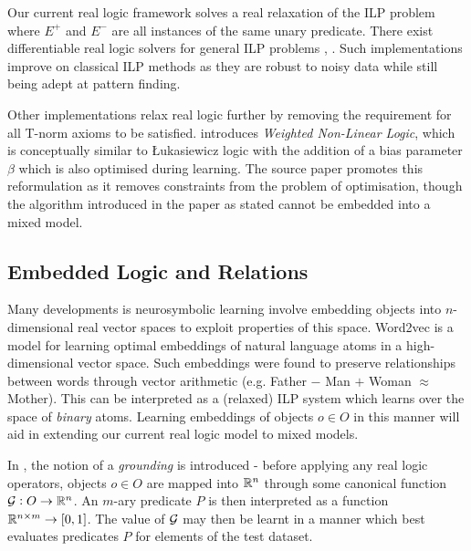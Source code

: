 Our current real logic framework solves a real relaxation of the ILP problem where $E^+$ and $E^-$ are all instances of the same unary predicate. There exist differentiable real logic solvers for general ILP problems \cite{diffilp}, \cite{diffilpGT}. Such implementations improve on classical ILP methods as they are robust to noisy data while still being adept at pattern finding.

Other implementations relax real logic further by removing the requirement for all T-norm axioms to be satisfied. \cite{lnnibm} introduces \textit{Weighted Non-Linear Logic}, which is conceptually similar to Łukasiewicz logic with the addition of a bias parameter $\beta$ which is also optimised during learning. The source paper promotes this reformulation as it removes constraints from the problem of optimisation, though the algorithm introduced in the paper as stated cannot be embedded into a mixed model.

\subsection{Embedded Logic and Relations}

Many developments is neurosymbolic learning involve embedding objects into $n$-dimensional real vector spaces to exploit properties of this space. Word2vec \cite{word2vec} is a model for learning optimal embeddings of natural language atoms in a high-dimensional vector space. Such embeddings were found to preserve relationships between words through vector arithmetic \cite{word2vecrelations} (e.g. Father $-$ Man $+$ Woman $\approx$ Mother). This can be interpreted as a (relaxed) ILP system which learns over the space of \textit{binary} atoms. Learning embeddings of objects $o \in O$ in this manner will aid in extending our current real logic model to mixed models.

In \cite{ltn2016}, the notion of a \textit{grounding} is introduced - before applying any real logic operators, objects $o \in O$ are mapped into $\mathbb{R}^n$ through some canonical function $\mathcal{G} : O \to \mathbb{R}^n$. An $m$-ary predicate $P$ is then interpreted as a function $\mathbb{R}^{n\times m} \to [0,1]$. The value of $\mathcal{G}$ may then be learnt in a manner which best evaluates predicates $P$ for elements of the test dataset. 

